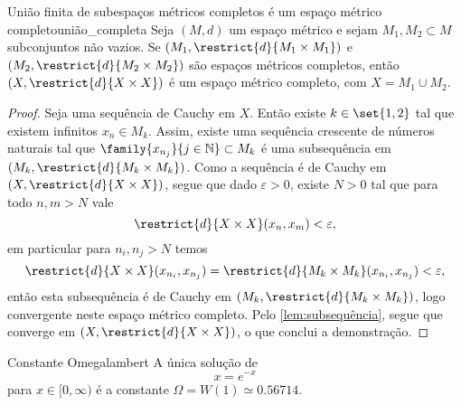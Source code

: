 \begin{lemma}{União finita de subespaços métricos completos é um espaço métrico completo}{união_completa}
    Seja \((M,d)\) um espaço métrico e sejam \(M_1, M_2 \subset M\) subconjuntos não vazios. Se \((M_1, \restrict{d}{M_1\times M_1})\) e \((M_2, \restrict{d}{M_2\times M_2})\) são espaços métricos completos, então \((X, \restrict{d}{X\times X})\) é um espaço métrico completo, com \(X = M_1 \cup M_2\).
\end{lemma}
\begin{proof}
    Seja  uma sequência de Cauchy em \(X\). Então existe \(k \in \set{1,2}\) tal que existem infinitos \(x_n \in M_k\). Assim, existe uma sequência crescente  de números naturais tal que \(\family{x_{n_j}}{j\in \mathbb{N}} \subset M_k\) é uma subsequência em \((M_k,\restrict{d}{M_k \times M_k})\). Como a sequência é de Cauchy em \((X, \restrict{d}{X\times X})\), segue que dado \(\varepsilon > 0\), existe \(N > 0\) tal que para todo \(n,m > N\) vale
    \begin{equation*}
        \restrict{d}{X\times X}(x_n, x_m) < \varepsilon,
    \end{equation*}
    em particular para \(n_i, n_j > N\) temos
    \begin{equation*}
        \restrict{d}{X\times X}(x_{n_i}, x_{n_j}) = \restrict{d}{M_k \times M_k}(x_{n_i}, x_{n_j}) < \varepsilon,
    \end{equation*}
    então esta subsequência é de Cauchy em \((M_k, \restrict{d}{M_k\times M_k})\), logo convergente neste espaço métrico completo. Pelo \cref{lem:subsequência}, segue que  converge em \((X, \restrict{d}{X\times X})\), o que conclui a demonstração.
\end{proof}
\begin{proposition}{Constante Omega}{lambert}
    A única solução de
    \begin{equation*}
        x = e^{-x}
    \end{equation*}
    para \(x \in [0,\infty)\) é a constante \(\Omega = W(1) \simeq 0.56714.\)
\end{proposition}
